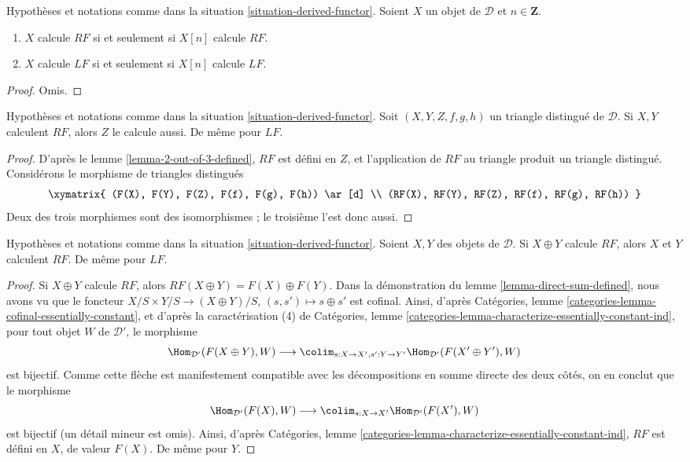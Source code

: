 \begin{lemma}
\label{lemma-computes-shift}
Hypothèses et notations comme dans la
situation \ref{situation-derived-functor}. Soient $X$ un objet de
$\mathcal{D}$ et $n \in \mathbf{Z}$.
\begin{enumerate}
\item $X$ calcule $RF$ si et seulement si $X[n]$ calcule $RF$.
\item $X$ calcule $LF$ si et seulement si $X[n]$ calcule $LF$.
\end{enumerate}
\end{lemma}

\begin{proof}
Omis.
\end{proof}

\begin{lemma}
\label{lemma-2-out-of-3-computes}
Hypothèses et notations comme dans la
situation \ref{situation-derived-functor}. Soit $(X, Y, Z, f, g, h)$ un
triangle distingué de $\mathcal{D}$. Si $X, Y$ calculent $RF$, alors $Z$ le
calcule aussi. De même pour $LF$.
\end{lemma}

\begin{proof}
D'après le lemme \ref{lemma-2-out-of-3-defined}, $RF$ est défini en $Z$, et
l'application de $RF$ au triangle produit un triangle distingué. Considérons
le morphisme de triangles distingués
$$
\xymatrix{
(F(X), F(Y), F(Z), F(f), F(g), F(h)) \ar[d] \\
(RF(X), RF(Y), RF(Z), RF(f), RF(g), RF(h))
}
$$
Deux des trois morphismes sont des isomorphismes ; le troisième l'est donc
aussi.
\end{proof}

\begin{lemma}
\label{lemma-direct-sum-computes}
Hypothèses et notations comme dans la
situation \ref{situation-derived-functor}. Soient $X, Y$ des objets de
$\mathcal{D}$. Si $X \oplus Y$ calcule $RF$, alors $X$ et $Y$ calculent $RF$.
De même pour $LF$.
\end{lemma}

\begin{proof}
Si $X \oplus Y$ calcule $RF$, alors
$RF(X \oplus Y) = F(X) \oplus F(Y)$. Dans la démonstration du
lemme \ref{lemma-direct-sum-defined}, nous avons vu que le foncteur
$X/S \times Y/S \to (X \oplus Y)/S$,
$(s, s') \mapsto s \oplus s'$ est cofinal. Ainsi, d'après Catégories, lemme
\ref{categories-lemma-cofinal-essentially-constant}, et d'après la
caractérisation (4) de Catégories, lemme
\ref{categories-lemma-characterize-essentially-constant-ind}, pour tout objet
$W$ de $\mathcal{D}'$, le morphisme
$$
\Hom_{\mathcal{D}'}(F(X \oplus Y), W)
\longrightarrow
\colim_{s : X \to X', s' : Y \to Y'}
\Hom_{\mathcal{D}'}(F(X' \oplus Y'), W)
$$
est bijectif. Comme cette flèche est manifestement compatible avec les
décompositions en somme directe des deux côtés, on en conclut que le morphisme
$$
\Hom_{\mathcal{D}'}(F(X), W)
\longrightarrow
\colim_{s : X \to X'} \Hom_{\mathcal{D}'}(F(X'), W)
$$
est bijectif (un détail mineur est omis). Ainsi, d'après Catégories, lemme
\ref{categories-lemma-characterize-essentially-constant-ind}, $RF$ est défini
en $X$, de valeur $F(X)$. De même pour $Y$.
\end{proof}

